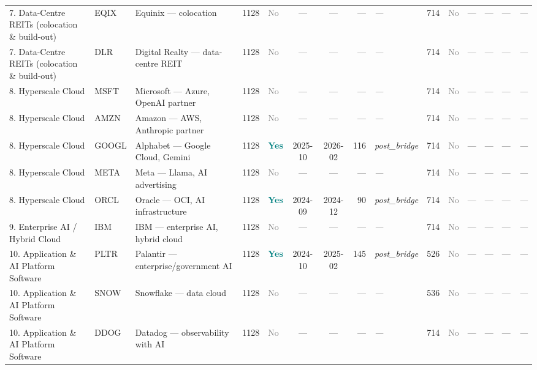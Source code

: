 \begin{table}[htbp]
\begin{tabular}{llp{3cm}r l cc r l  r l cc r l}
\midrule
7. Data-Centre REITs (colocation \& build-out) & EQIX & Equinix --- colocation & 1128 & \textcolor{gray}{No} & --- & --- & --- & \textit{---} & 714 & \textcolor{gray}{No} & --- & --- & --- & \textit{---} \\
7. Data-Centre REITs (colocation \& build-out) & DLR & Digital Realty --- data-centre REIT & 1128 & \textcolor{gray}{No} & --- & --- & --- & \textit{---} & 714 & \textcolor{gray}{No} & --- & --- & --- & \textit{---} \\
\midrule
8. Hyperscale Cloud & MSFT & Microsoft --- Azure, OpenAI partner & 1128 & \textcolor{gray}{No} & --- & --- & --- & \textit{---} & 714 & \textcolor{gray}{No} & --- & --- & --- & \textit{---} \\
8. Hyperscale Cloud & AMZN & Amazon --- AWS, Anthropic partner & 1128 & \textcolor{gray}{No} & --- & --- & --- & \textit{---} & 714 & \textcolor{gray}{No} & --- & --- & --- & \textit{---} \\
8. Hyperscale Cloud & GOOGL & Alphabet --- Google Cloud, Gemini & 1128 & \textcolor{teal}{\textbf{Yes}} & 2025-10 & 2026-02 & 116 & \textit{post\_bridge} & 714 & \textcolor{gray}{No} & --- & --- & --- & \textit{---} \\
8. Hyperscale Cloud & META & Meta --- Llama, AI advertising & 1128 & \textcolor{gray}{No} & --- & --- & --- & \textit{---} & 714 & \textcolor{gray}{No} & --- & --- & --- & \textit{---} \\
8. Hyperscale Cloud & ORCL & Oracle --- OCI, AI infrastructure & 1128 & \textcolor{teal}{\textbf{Yes}} & 2024-09 & 2024-12 & 90 & \textit{post\_bridge} & 714 & \textcolor{gray}{No} & --- & --- & --- & \textit{---} \\
\midrule
9. Enterprise AI / Hybrid Cloud & IBM & IBM --- enterprise AI, hybrid cloud & 1128 & \textcolor{gray}{No} & --- & --- & --- & \textit{---} & 714 & \textcolor{gray}{No} & --- & --- & --- & \textit{---} \\
\midrule
10. Application \& AI Platform Software & PLTR & Palantir --- enterprise/government AI & 1128 & \textcolor{teal}{\textbf{Yes}} & 2024-10 & 2025-02 & 145 & \textit{post\_bridge} & 526 & \textcolor{gray}{No} & --- & --- & --- & \textit{---} \\
10. Application \& AI Platform Software & SNOW & Snowflake --- data cloud & 1128 & \textcolor{gray}{No} & --- & --- & --- & \textit{---} & 536 & \textcolor{gray}{No} & --- & --- & --- & \textit{---} \\
10. Application \& AI Platform Software & DDOG & Datadog --- observability with AI & 1128 & \textcolor{gray}{No} & --- & --- & --- & \textit{---} & 714 & \textcolor{gray}{No} & --- & --- & --- & \textit{---} \\

\end{tabular}
\end{table}
